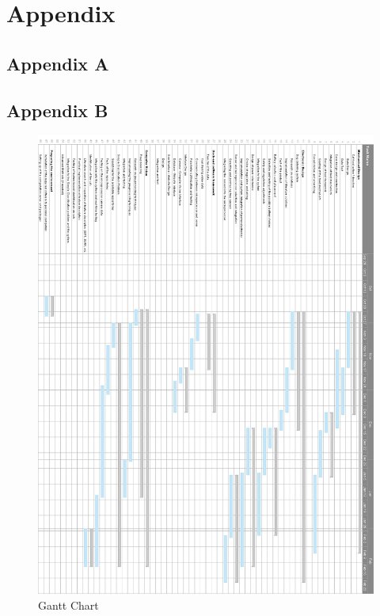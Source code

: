 \section{Appendix} \label{sec:appendix}

\subsection{Appendix A}

\pagebreak


\subsection{Appendix B}
\begin{figure}[tbh]
    \centering
    \includegraphics[width=0.95\linewidth,height=0.5\paperheight]{img/gant.jpg}
    \caption{Gantt Chart}
    \label{fig:GanttChart}
\end{figure}
\pagebreak